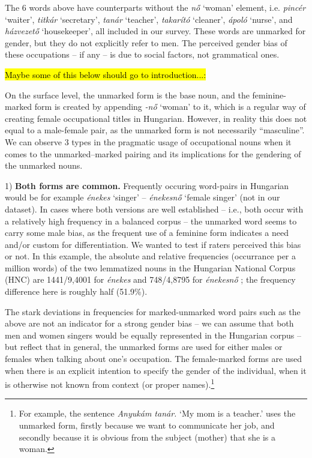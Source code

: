 \documentclass[11pt]{article}
\begin{document}
The 6 words above have counterparts without the \textit{nő} `woman' element, i.e. \textit{pincér} `waiter', \textit{titkár} `secretary', \textit{tanár} `teacher', \textit{takarító} `cleaner', \textit{ápoló} `nurse', and \textit{házvezető} `housekeeper', all included in our survey. These words are unmarked for gender, but they do not explicitly refer to men. The perceived gender bias of these occupations -- if any -- is due to social factors, not grammatical ones.

\hl{Maybe some of this below should go to introduction...:}

On the surface level, the unmarked form is the base noun, and the feminine-marked form is created by appending \textit{-nő} `woman' to it, which is a regular way of creating female occupational titles in Hungarian. However, in reality this does not equal to a male-female pair, as the unmarked form is not necessarily ``masculine''. We can observe 3 types in the pragmatic usage of occupational nouns when it comes to the unmarked--marked pairing and its implications for the gendering of the unmarked nouns.

1) \textbf{Both forms are common.} Frequently occuring word-pairs in Hungarian would be for example \textit{énekes} `singer' -- \textit{énekesnő} `female singer' (not in our dataset). In cases where both versions are well established -- i.e., both occur with a relatively high frequency in a balanced corpus -- the unmarked word seems to carry some male bias, as the frequent use of a feminine form indicates a need and/or custom for differentiation. We wanted to test if raters perceived this bias or not. In this example, the absolute and relative frequencies (occurrance per a million words) of the two lemmatized nouns in the Hungarian National Corpus (HNC) are 1441/9,4001 for \textit{énekes} and 748/4,8795 for \textit{énekesnő} \citep{varadi_2002_hungarian, oravecz_2014_hungarian}; the frequency difference here is roughly half (51.9\%).

The stark deviations in frequencies for marked-unmarked word pairs such as the above are not an indicator for a strong gender bias -- we can assume that both men and women singers would be equally represented in the Hungarian corpus -- but reflect that in general, the unmarked forms are used for either males or females when talking about one's occupation. The female-marked forms are used when there is an explicit intention to specify the gender of the individual, when it is otherwise not known from context (or proper names).\footnote{For example, the sentence \textit{Anyukám tanár.} `My mom is a teacher.' uses the unmarked form, firstly because we want to communicate her job, and secondly because it is obvious from the subject (mother) that she is a woman.}
\end{document}
